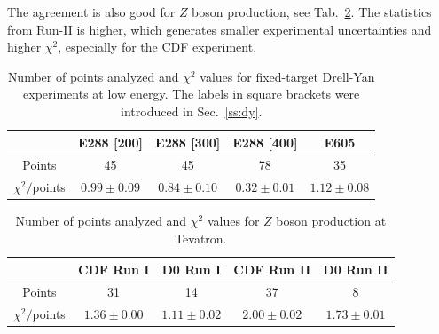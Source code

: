 \documentclass[aps,preprintnumbers,showpacs,nofootinbib,superscriptaddress,floatfix]{revtex4}
\begin{document}
The agreement is also good for $Z$ boson production, see Tab.~\ref{t:fl_ind_chi2_Z}. The statistics from Run-II is higher, which generates smaller experimental uncertainties and higher $\chi^2$, especially for the CDF experiment.
\begin{table}[h!]
\begin{center}
\renewcommand{\tabcolsep}{0.4pc} %
\renewcommand{\arraystretch}{1.2} %
\begin{tabular}{|c|c|c|c|c|}
 \hline
 \hline
 ~                        &  E288 [200]    &  E288 [300]        &  E288 [400]          &  E605                \\
 \hline
 Points                   &      45      &   45             &       78           &     35               \\
 \hline
$ \chi^2  /$points      &  $0.99\pm 0.09$        &    $0.84\pm 0.10$           &       $0.32\pm 0.01$ &   $1.12\pm 0.08$     \\
\hline
\hline
\end{tabular}
\caption{Number of points analyzed and $\chi^2$ values for fixed-target Drell-Yan experiments at low energy. The labels in square brackets were introduced in Sec.~\ref{ss:dy}.}
\label{t:fl_ind_chi2_DY}
\end{center}
\end{table}
\begin{table}[h!]
\begin{center}
\renewcommand{\tabcolsep}{0.4pc} %
\renewcommand{\arraystretch}{1.2} %
\begin{tabular}{|c|c|c|c|c|}
 \hline
\hline
 ~                        & CDF Run I    &  D0 Run I        & CDF Run II        & D0 Run II      \\
 \hline
 Points                   &      31      &   14             &       37          &        8       \\
 \hline
$\chi^2 /$points     &  $1.36\pm 0.00$        &    $1.11\pm 0.02$           &       $2.00\pm 0.02$         &   $1.73\pm 0.01$     \\
\hline
\hline
\end{tabular}
\caption{Number of points analyzed and $\chi^2$ values for $Z$ boson production at Tevatron.}
\label{t:fl_ind_chi2_Z}
\end{center}
\end{table}
\end{document}
